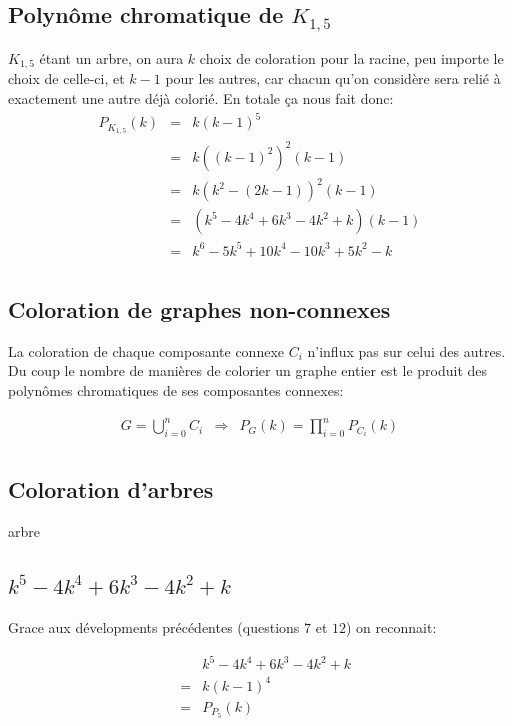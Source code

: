 \subsection{Polynôme chromatique de $K_{1,5}$}
$K_{1,5}$ étant un arbre, on aura $k$ choix de coloration pour la racine, peu importe le choix de celle-ci, et $k-1$ pour les autres, car chacun qu'on considère sera relié à exactement une autre déjà colorié. En totale ça nous fait donc:
\begin{eqnarray*}
P_{K_{1,5}}(k) 	& = & k(k-1)^5 \\
				& = & k{((k-1)^2)}^2(k-1)	\\
				& = & k(k^2 - (2k - 1))^2(k-1)	\\
				& = & (k^5 - 4k^4  + 6k^3 - 4k^2 + k)(k-1)  \\
				& = & k^6 - 5k^5  + 10k^4 - 10k^3 + 5k^2 - k	\\ 
\end{eqnarray*}

\subsection{Coloration de graphes non-connexes}
La coloration de chaque composante connexe $C_i$ n'influx pas sur celui des autres. Du coup le nombre de manières de colorier un graphe entier est le produit des polynômes chromatiques de ses composantes connexes:

\begin{eqnarray*}
G = \bigcup_{i=0}^n C_i & \Rightarrow & P_G(k)=\prod_{i=0}^n P_{C_i}(k) \\
\end{eqnarray*}

\subsection{Coloration d'arbres}
arbre

\subsection{$k^5 - 4k^4 + 6k^3 - 4k^2 + k$}
Grace aux dévelopments précédentes (questions $7$ et $12$) on reconnait:

\begin{eqnarray*}
&&		k^5 - 4k^4 + 6k^3 - 4k^2 + k \\	
&=&		k(k-1)^4	\\
&=&		P_{P_5}(k)	\\
\end{eqnarray*}

